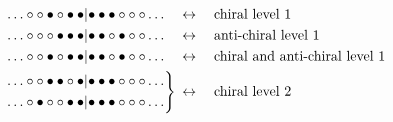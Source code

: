 \documentclass[a4paper,10pt]{article}
\begin{document}
\begin{equation*}
\begin{split}
\hdots\circ\circ\bullet\circ\bullet\bullet \hspace*{-0pt}|\hspace*{-2pt} \bullet\bullet\bullet\circ\circ\circ\hdots\quad &\leftrightarrow \quad \text{chiral level 1}\\
\hdots\circ\circ\circ\bullet\bullet\bullet\hspace*{-0pt}|\hspace*{-2pt} \bullet\bullet\circ\bullet\circ\circ\hdots\quad &\leftrightarrow \quad \text{anti-chiral level 1}\\
\hdots\circ\circ\bullet\circ\bullet\bullet\hspace*{-0pt}|\hspace*{-2pt} \bullet\bullet\circ\bullet\circ\circ\hdots\quad &\leftrightarrow \quad \text{chiral and anti-chiral level 1}\\
%
    \left. \begin{aligned}
        \hdots\circ\circ\bullet\bullet\circ\bullet\hspace*{-0pt}|\hspace*{-2pt} \bullet\bullet\bullet\circ\circ\circ\hdots\\
        \hdots\circ\bullet\circ\circ\bullet\bullet\hspace*{-0pt}|\hspace*{-2pt} \bullet\bullet\bullet\circ\circ\circ\hdots\\
        \end{aligned}\right\} \hspace*{2pt} &\leftrightarrow \quad \text{chiral level 2}\\
%
%
\end{split}
\end{equation*}

\end{document}
